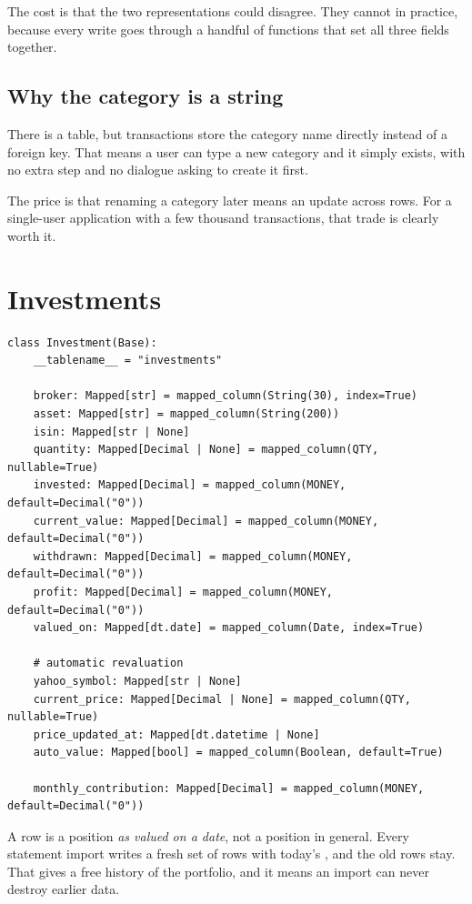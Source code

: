 The cost is that the two representations could disagree. They cannot in practice,
because every write goes through a handful of functions that set all three
fields together.

\subsection{Why the category is a string}

There is a  table, but transactions store the category name
directly instead of a foreign key. That means a user can type a new category and
it simply exists, with no extra step and no dialogue asking to create it first.

The price is that renaming a category later means an update across rows. For a
single-user application with a few thousand transactions, that trade is clearly
worth it.

\section{Investments}

\begin{lstlisting}[style=py]
class Investment(Base):
    __tablename__ = "investments"

    broker: Mapped[str] = mapped_column(String(30), index=True)
    asset: Mapped[str] = mapped_column(String(200))
    isin: Mapped[str | None]
    quantity: Mapped[Decimal | None] = mapped_column(QTY, nullable=True)
    invested: Mapped[Decimal] = mapped_column(MONEY, default=Decimal("0"))
    current_value: Mapped[Decimal] = mapped_column(MONEY, default=Decimal("0"))
    withdrawn: Mapped[Decimal] = mapped_column(MONEY, default=Decimal("0"))
    profit: Mapped[Decimal] = mapped_column(MONEY, default=Decimal("0"))
    valued_on: Mapped[dt.date] = mapped_column(Date, index=True)

    # automatic revaluation
    yahoo_symbol: Mapped[str | None]
    current_price: Mapped[Decimal | None] = mapped_column(QTY, nullable=True)
    price_updated_at: Mapped[dt.datetime | None]
    auto_value: Mapped[bool] = mapped_column(Boolean, default=True)

    monthly_contribution: Mapped[Decimal] = mapped_column(MONEY, default=Decimal("0"))
\end{lstlisting}

A row is a position \emph{as valued on a date}, not a position in general. Every
statement import writes a fresh set of rows with today's , and
the old rows stay. That gives a free history of the portfolio, and it means an
import can never destroy earlier data.

